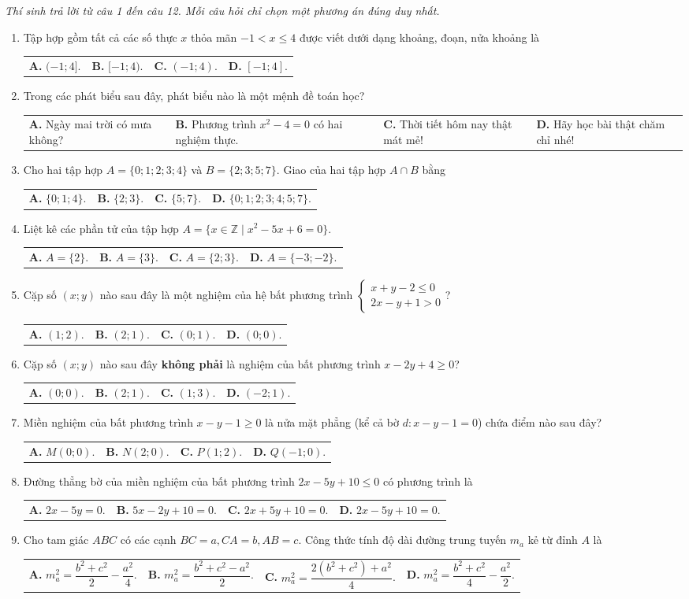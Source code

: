 \documentclass[12pt,a4paper]{article}
\makeatletter
\newcommand{\parttitle}[1]{\par\vspace{2pt}{\large\bfseries\color{ink}#1}\par\vspace{1pt}}
\newcommand{\four}[4]{\par\noindent\begin{tabularx}{\linewidth}{@{}*{4}{>{\raggedright\arraybackslash}X}@{}}\textbf{A.} #1&\textbf{B.} #2&\textbf{C.} #3&\textbf{D.} #4\end{tabularx}}
\makeatother
\begin{document}
\parttitle{PHẦN I. Trắc nghiệm nhiều lựa chọn}
\textit{Thí sinh trả lời từ câu 1 đến câu 12. Mỗi câu hỏi chỉ chọn một phương án đúng duy nhất.}
\begin{enumerate}
\item Tập hợp gồm tất cả các số thực $x$ thỏa mãn $-1 < x \le 4$ được viết dưới dạng khoảng, đoạn, nửa khoảng là
\four{$(-1; 4]$.}{$[-1; 4)$.}{$(-1; 4)$.}{$[-1; 4]$.}

\item Trong các phát biểu sau đây, phát biểu nào là một mệnh đề toán học?
\four{Ngày mai trời có mưa không?}{Phương trình $x^2 - 4 = 0$ có hai nghiệm thực.}{Thời tiết hôm nay thật mát mẻ!}{Hãy học bài thật chăm chỉ nhé!}

\item Cho hai tập hợp $A = \{0; 1; 2; 3; 4\}$ và $B = \{2; 3; 5; 7\}$. Giao của hai tập hợp $A \cap B$ bằng
\four{$\{0; 1; 4\}$.}{$\{2; 3\}$.}{$\{5; 7\}$.}{$\{0; 1; 2; 3; 4; 5; 7\}$.}

\item Liệt kê các phần tử của tập hợp $A = \{x \in \mathbb{Z} \mid x^2 - 5x + 6 = 0\}$.
\four{$A = \{2\}$.}{$A = \{3\}$.}{$A = \{2; 3\}$.}{$A = \{-3; -2\}$.}

\item Cặp số $(x; y)$ nào sau đây là một nghiệm của hệ bất phương trình $\begin{cases} x + y - 2 \le 0 \\ 2x - y + 1 > 0 \end{cases}$?
\four{$(1; 2)$.}{$(2; 1)$.}{$(0; 1)$.}{$(0; 0)$.}

\item Cặp số $(x; y)$ nào sau đây \textbf{không phải} là nghiệm của bất phương trình $x - 2y + 4 \ge 0$?
\four{$(0; 0)$.}{$(2; 1)$.}{$(1; 3)$.}{$(-2; 1)$.}

\item Miền nghiệm của bất phương trình $x - y - 1 \ge 0$ là nửa mặt phẳng (kể cả bờ $d: x - y - 1 = 0$) chứa điểm nào sau đây?
\four{$M(0; 0)$.}{$N(2; 0)$.}{$P(1; 2)$.}{$Q(-1; 0)$.}

\item Đường thẳng bờ của miền nghiệm của bất phương trình $2x - 5y + 10 \le 0$ có phương trình là
\four{$2x - 5y = 0$.}{$5x - 2y + 10 = 0$.}{$2x + 5y + 10 = 0$.}{$2x - 5y + 10 = 0$.}

\item Cho tam giác $ABC$ có các cạnh $BC = a, CA = b, AB = c$. Công thức tính độ dài đường trung tuyến $m_a$ kẻ từ đỉnh $A$ là
\four{$m_a^2 = \dfrac{b^2 + c^2}{2} - \dfrac{a^2}{4}$.}{$m_a^2 = \dfrac{b^2 + c^2 - a^2}{2}$.}{$m_a^2 = \dfrac{2(b^2 + c^2) + a^2}{4}$.}{$m_a^2 = \dfrac{b^2 + c^2}{4} - \dfrac{a^2}{2}$.}


\end{enumerate}
\end{document}
